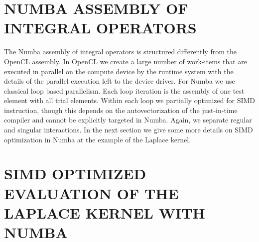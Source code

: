 \section{NUMBA ASSEMBLY OF INTEGRAL OPERATORS}

The Numba assembly of integral operators is structured differently from the OpenCL assembly. In OpenCL we create a large number of work-items that are executed in parallel on the compute device by the runtime system with the details of the parallel execution left to the device driver. For Numba we use classical loop based parallelism. Each loop iteration is the assembly of one test element with all trial elements. Within each loop we partially optimized for SIMD instruction, though this depends on the autovectorization of the just-in-time compiler and cannot be explicitly targeted in Numba. Again, we separate regular and singular interactions. In the next section we give some more details on SIMD optimization in Numba at the example of the Laplace kernel.

\section{SIMD OPTIMIZED EVALUATION OF THE LAPLACE KERNEL WITH NUMBA}
